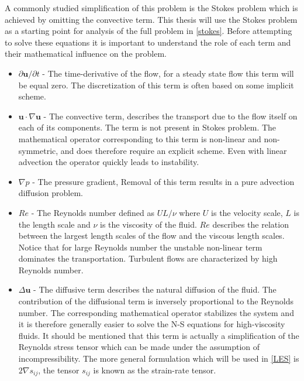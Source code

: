 A commonly studied simplification of this problem is the Stokes problem which
is achieved by omitting the convective term. This thesis will use the Stokes 
problem as a starting point for analysis of the full problem in \cref{stokes}.
Before attempting to solve these equations it is important to understand the role of each term 
and their mathematical influence on the problem. 
\begin{itemize}
    \item $\partial \mathbf{u} /\partial t$
     - The time-derivative of the flow, for a steady state flow this term will be equal zero.
             The discretization of this term is often based on some implicit scheme. 
    \item $\mathbf{u} \cdot \nabla \mathbf{u}$
     - The convective term, describes the transport due to the flow itself on each of its components. 
    The term is not present in Stokes problem.
    The mathematical operator corresponding to this term is non-linear and non-symmetric, and does therefore require an explicit scheme. 
    Even with linear advection the operator quickly leads to instability. 

    \item $\nabla p$
    - The pressure gradient, Removal of this term results in a pure advection diffusion problem.

    \item $Re$ 
    - The Reynolds number defined as $UL/\nu$ where $U$ is the velocity scale, $L$ is the length scale and $\nu$ 
      is the viscosity of the fluid. $Re$ describes the relation between the largest length scales of the flow
      and the viscous length scales. Notice that for large Reynolds number the unstable non-linear term 
      dominates the transportation. Turbulent flows are characterized by high Reynolds number.

    \item $\Delta \mathbf{u}$ 
    - The diffusive term describes the natural diffusion of the fluid. The contribution of the diffusional term 
    is inversely proportional to the Reynolds number.
    The corresponding mathematical operator stabilizes the system and it is therefore generally easier
    to solve the N-S equations for high-viscosity fluids. It should be mentioned that this term is actually a simplification 
    of the Reynolds stress tensor which can be made under the assumption of incompressibility. The more general formulation which 
    will be used in \cref{LES} is $2 \nabla s_{ij}$, the tensor $s_{ij}$ is known as the strain-rate tensor. 


\end{itemize}
